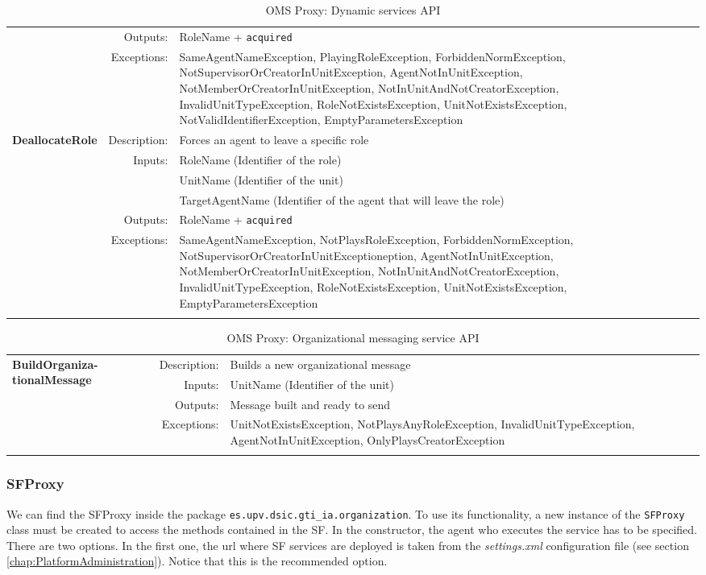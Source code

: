 \begin{longtable}{|p{3cm}|r|p{8.5cm}|}
    & Outputs:     & RoleName + \texttt{acquired} \\ \cline{2-3}
    & Exceptions:  & SameAgentNameException, PlayingRoleException, ForbiddenNormException, NotSupervisorOrCreatorInUnitException, AgentNotInUnitException, NotMemberOrCreatorInUnitException, NotInUnitAndNotCreatorException, InvalidUnitTypeException, RoleNotExistsException, UnitNotExistsException, NotValidIdentifierException, EmptyParametersException \\ \hline
  \hline
  \multirow{6}{*}{\textbf{DeallocateRole}} & Description: & Forces an agent to leave a specific role \\ \cline{2-3}
    & Inputs: & RoleName (Identifier of the role) \\ \cline{3-3}
    &  & UnitName (Identifier of the unit) \\ \cline{3-3}
    &  & TargetAgentName (Identifier of the agent that will leave the role) \\ \cline{2-3}
    & Outputs:     & RoleName + \texttt{acquired} \\ \cline{2-3}
    & Exceptions:  & SameAgentNameException, NotPlaysRoleException, ForbiddenNormException, NotSupervisorOrCreatorInUnitExceptioneption, AgentNotInUnitException, NotMemberOrCreatorInUnitException, NotInUnitAndNotCreatorException, InvalidUnitTypeException, RoleNotExistsException, UnitNotExistsException, EmptyParametersException \\ \hline
\caption{OMS Proxy: Dynamic services API}
\label{tab:thomas_OMSProxy_compound}
\end{longtable}


\begin{longtable}{|p{3cm}|r|p{8.5cm}|}
  \hline
  \multirow{4}{*}{\parbox{3cm}{\textbf{BuildOrganiza- tionalMessage}}} & Description: & Builds a new organizational message \\ \cline{2-3}
    & Inputs: & UnitName (Identifier of the unit) \\ \cline{2-3}
    & Outputs:     & Message built and ready to send\\
    & Exceptions:  & UnitNotExistsException, NotPlaysAnyRoleException, InvalidUnitTypeException, AgentNotInUnitException, OnlyPlaysCreatorException \\ \hline
\caption{OMS Proxy: Organizational messaging service API}
\label{tab:thomas_OMSProxy_messaging}
\end{longtable}


\subsubsection{SFProxy}
We can find the SFProxy inside the package \lstinline|es.upv.dsic.gti_ia.organization|. To use its functionality, a new instance of the \lstinline|SFProxy| class must be created to access the methods contained in the SF. In the constructor, the agent who executes the service has to be specified. There are two options. In the first one, the url where SF services are deployed is taken from the \textit{settings.xml} configuration file (see section \ref{chap:PlatformAdministration}). Notice that this is the recommended option.

